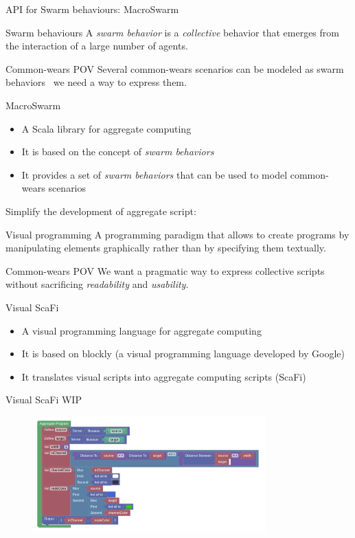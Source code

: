\documentclass[presentation, 9pt, aspectratio=169]{beamer}\mode<presentation>{\usetheme{AMSBolognaFC}}
\begin{document}
\begin{frame}{API for Swarm behaviours: MacroSwarm}
	\begin{alertblock}{Swarm behaviours}
		A \emph{swarm behavior} is a \emph{collective} behavior that emerges from the interaction of a large number of agents.
	\end{alertblock}
	\begin{exampleblock}{Common-wears POV}
		Several common-wears scenarios can be modeled as swarm behaviors \faArrowRight \, we need a  way to express them.
	\end{exampleblock}
	\begin{exampleblock}{MacroSwarm}
		\begin{itemize}
			\item A Scala library for aggregate computing
			\item It is based on the concept of \emph{swarm behaviors}
			\item It provides a set of \emph{swarm behaviors} that can be used to model common-wears scenarios
		\end{itemize}
	\end{exampleblock}
\end{frame}
\begin{frame}{Simplify the development of aggregate script: }
	\begin{alertblock}{Visual programming}
		A programming paradigm that allows to create programs by manipulating elements graphically rather than by specifying them textually.		
	\end{alertblock}
	\begin{exampleblock}{Common-wears POV}
		We want a pragmatic way to express collective scripts without sacrificing \emph{readability} and \emph{usability}.
	\end{exampleblock}
	\begin{exampleblock}{Visual ScaFi}
		\begin{itemize}
			\item A visual programming language for aggregate computing
			\item It is based on blockly (a visual programming language developed by Google)
			\item It translates visual scripts into aggregate computing scripts (ScaFi)		
		\end{itemize}
	\end{exampleblock}
\end{frame}
\begin{frame}{Visual ScaFi WIP}
\begin{figure}
	\centering
	\includegraphics[width=0.8\textwidth]{img/example}
\end{figure}
\end{frame}
\end{document}
